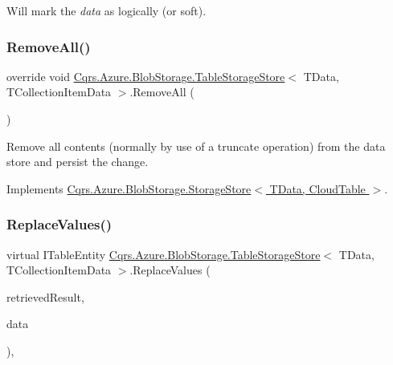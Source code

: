 Will mark the {\itshape data}  as logically (or soft). 

\mbox{\label{classCqrs_1_1Azure_1_1BlobStorage_1_1TableStorageStore_aadd66b35bfa105ef4446bd791e99a3d5_aadd66b35bfa105ef4446bd791e99a3d5}} 
\subsubsection{\texorpdfstring{Remove\+All()}{RemoveAll()}}
{\footnotesize\ttfamily override void \hyperlink{classCqrs_1_1Azure_1_1BlobStorage_1_1TableStorageStore}{Cqrs.\+Azure.\+Blob\+Storage.\+Table\+Storage\+Store}$<$ T\+Data, T\+Collection\+Item\+Data $>$.Remove\+All (\begin{DoxyParamCaption}{ }\end{DoxyParamCaption})\hspace{0.3cm}{\ttfamily [virtual]}}



Remove all contents (normally by use of a truncate operation) from the data store and persist the change. 



Implements \hyperlink{classCqrs_1_1Azure_1_1BlobStorage_1_1StorageStore_a4e848f342be903293812b3b660464d1a_a4e848f342be903293812b3b660464d1a}{Cqrs.\+Azure.\+Blob\+Storage.\+Storage\+Store$<$ T\+Data, Cloud\+Table $>$}.

\mbox{\label{classCqrs_1_1Azure_1_1BlobStorage_1_1TableStorageStore_adc625eceee6e2b190997a771740e01b9_adc625eceee6e2b190997a771740e01b9}} 
\subsubsection{\texorpdfstring{Replace\+Values()}{ReplaceValues()}}
{\footnotesize\ttfamily virtual I\+Table\+Entity \hyperlink{classCqrs_1_1Azure_1_1BlobStorage_1_1TableStorageStore}{Cqrs.\+Azure.\+Blob\+Storage.\+Table\+Storage\+Store}$<$ T\+Data, T\+Collection\+Item\+Data $>$.Replace\+Values (\begin{DoxyParamCaption}\item[{Table\+Result}]{retrieved\+Result,  }\item[{T\+Data}]{data }\end{DoxyParamCaption})\hspace{0.3cm}{\ttfamily [protected]}, {\ttfamily [virtual]}}



